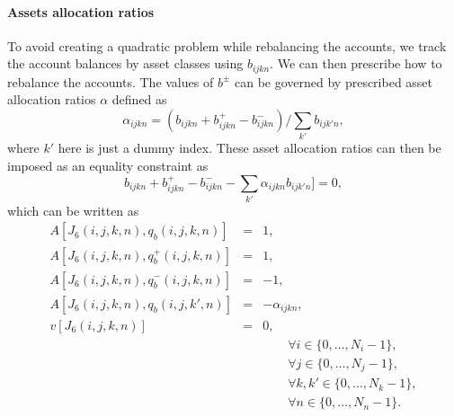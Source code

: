 \documentclass{article}[fleqn,12pt]
\begin{document}
\paragraph*{Assets allocation ratios}
To avoid creating a quadratic problem while rebalancing the accounts, we track the account balances
by asset classes using $b_{ijkn}$. We can then prescribe how to rebalance the accounts.
The values of $b^\pm$ can be governed by prescribed asset allocation ratios $\alpha$ defined as
\begin{equation}
	\label{Eq:Alloc1}
	\alpha_{ijkn} = (b_{ijkn} + b^+_{ijkn} - b^-_{ijkn})/\sum_{k'} b_{ijk'n},
\end{equation}
where $k'$ here is just a dummy index.
These asset allocation ratios can then be imposed as an equality constraint as
\begin{equation}
	\label{Eq:Alloc2}
	b_{ijkn} + b^+_{ijkn} - b^-_{ijkn} - \sum_{k'} \alpha_{ijkn} b_{ijk'n}] = 0,
\end{equation}
which can be written as
\begin{eqnarray}
	\label{Eq:Alloc3}
	A[J_6(i, j, k, n), q_b(i, j, k, n)] &=& 1, \nonumber\\
	A[J_6(i, j, k, n), q_b^+(i, j, k, n)] &=& 1, \nonumber\\
	A[J_6(i, j, k, n), q_b^-(i, j, k, n)] &=& -1, \nonumber\\
	A[J_6(i, j, k, n), q_b(i, j, k', n)] &=& - \alpha_{ijkn}, \nonumber\\
	v[J_6(i, j, k, n)] &=& 0, \\
	&&\qquad\forall i \in \{0,\ldots, N_i-1\},\nonumber\\
	&&\qquad\forall j \in \{0,\ldots, N_j-1\},\nonumber\\
	&&\qquad\forall k,k' \in \{0,\ldots, N_k-1\},\nonumber\\
	&&\qquad\forall n \in \{0,\ldots, N_n-1\}. \nonumber
\end{eqnarray}
\end{document}
